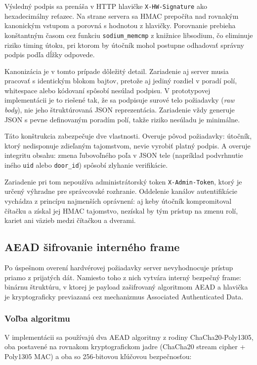 \documentclass[journal,a4paper,onecolumn]{IEEEtran}
\begin{document}
Výsledný podpis sa prenáša v HTTP hlavičke \texttt{X-HW-Signature} ako hexadecimálny reťazec. Na strane servera sa HMAC prepočíta nad rovnakým kanonickým vstupom a porovná s hodnotou z hlavičky. Porovnanie prebieha konštantným časom cez funkciu \texttt{sodium\_memcmp} z knižnice libsodium, čo eliminuje riziko timing útoku, pri ktorom by útočník mohol postupne odhadovať správny podpis podľa dĺžky odpovede\cite{FIPS1981,RFC2104}.

Kanonizácia je v tomto prípade dôležitý detail. Zariadenie aj server musia pracovať s identickým blokom bajtov, pretože aj jediný rozdiel v poradí polí, whitespace alebo kódovaní spôsobí nesúlad podpisu. V prototypovej implementácii je to riešené tak, že sa podpisuje surové telo požiadavky (\emph{raw body}), nie jeho štruktúrovaná JSON reprezentácia. Zariadenie vždy generuje JSON s pevne definovaným poradím polí, takže riziko nesúladu je minimálne.

Táto konštrukcia zabezpečuje dve vlastnosti. Overuje pôvod požiadavky: útočník, ktorý nedisponuje zdieľaným tajomstvom, nevie vyrobiť platný podpis. A overuje integritu obsahu: zmena ľubovoľného poľa v JSON tele (napríklad podvrhnutie iného \texttt{uid} alebo \texttt{door\_id}) spôsobí zlyhanie verifikácie.

Zariadenie pri tom nepoužíva administrátorský token \texttt{X-Admin-Token}, ktorý je určený výhradne pre správcovské rozhranie. Oddelenie kanálov autentifikácie vychádza z princípu najmenších oprávnení: aj keby útočník kompromitoval čítačku a získal jej HMAC tajomstvo, nezískal by tým prístup na zmenu rolí, kariet ani väzieb medzi čítačkou a dverami\cite{OWASPAPI2023}.

\subsection{AEAD šifrovanie interného frame}

Po úspešnom overení hardvérovej požiadavky server nevyhodnocuje prístup priamo z prijatých dát. Namiesto toho z nich vytvára interný bezpečný frame: binárnu štruktúru, v ktorej je payload zašifrovaný algoritmom AEAD a hlavička je kryptograficky previazaná cez mechanizmus Associated Authenticated Data.

\subsubsection{Voľba algoritmu}

V implementácii sa používajú dva AEAD algoritmy z rodiny ChaCha20-Poly1305, oba postavené na rovnakom kryptografickom jadre (ChaCha20 stream cipher + Poly1305 MAC) a oba so 256-bitovou kľúčovou bezpečnosťou:
\end{document}
